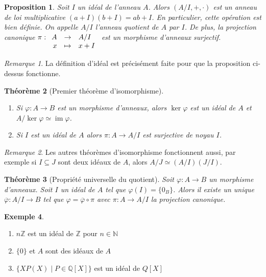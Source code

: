 \documentclass{article}
\newcommand{\N}{\mathbb{N}}
\newcommand{\Z}{\mathbb{Z}}
\newcommand{\Q}{\mathbb{Q}}
\DeclareMathOperator{\im}{im}
\newcommand{\applic}[4]{\begin{array}[t]{rcl}
#1 & \to & #2 \\
#3 & \mapsto & #4
\end{array}}
\renewcommand{\subset}{\subseteq}
\theoremstyle{plain}
\newtheorem{theorem}{Théorème}[section]
\newtheorem{proposition}[theorem]{Proposition}
\theoremstyle{definition}
\newtheorem{example}[theorem]{Exemple}
\theoremstyle{remark}
\newtheorem*{remark}{Remarque}
\begin{document}
\begin{proposition}
    Soit $I$ un idéal de l'anneau $A$. Alors $(A/I,+,\cdot)$ est un anneau de loi multiplicative $(a+I) (b+I) = ab + I$. En particulier, cette opération est bien définie. On appelle $A/I$ \emph{l'anneau quotient de $A$ par $I$}. De plus, la projection canonique $\pi : \applic{A}{A/I}{x}{x+I}$ est un morphisme d'anneaux surjectif.
\end{proposition}

\begin{remark}
    La définition d'idéal est précisément faite pour que la proposition ci-dessus fonctionne.
\end{remark}

\begin{theorem}[Premier théorème d'isomorphisme] \leavevmode
    \begin{enumerate}
        \item Si $\varphi : A \to B$ est un morphisme d'anneaux, alors $\ker \varphi$ est un idéal de $A$ et $A/\ker \varphi \simeq \im \varphi$.
        \item Si $I$ est un idéal de $A$ alors $\pi : A \to A/I$ est surjective de noyau $I$.
    \end{enumerate}
\end{theorem}

\begin{remark}
    Les autres théorèmes d'isomorphisme fonctionnent aussi, par exemple si $I \subset J$ sont deux idéaux de $A$, alors $A/J \simeq (A/I)(J/I)$.
\end{remark}

\begin{theorem}[Propriété universelle du quotient]
    Soit $\varphi : A \to B$ un morphisme d'anneaux. Soit $I$ un idéal de $A$ tel que $\varphi(I) = \{0_B\}$. Alors il existe un unique $\overline{\varphi} : A/I \to B$ tel que $\varphi = \overline{\varphi} \circ \pi$ avec $\pi : A \to A/I$ la projection canonique.
    \begin{center}
    \end{center}
\end{theorem}

\begin{example} \leavevmode
    \begin{enumerate}
        \item $n\Z$ est un idéal de $\Z$ pour $n \in \N$
        \item $\{0\}$ et $A$ sont des idéaux de $A$
        \item $\{X P(X) \mid P \in \Q[X]\}$ est un idéal de $Q[X]$
    \end{enumerate}
\end{example}
\end{document}
